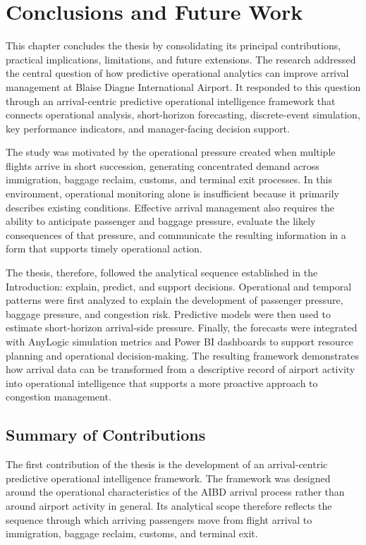 \chapter{Conclusions and Future Work}
\label{chap:conclusions-future-work}

This chapter concludes the thesis by consolidating its principal contributions, practical implications, limitations, and future extensions. The research addressed the central question of how predictive operational analytics can improve arrival management at Blaise Diagne International Airport. It responded to this question through an arrival-centric predictive operational intelligence framework that connects operational analysis, short-horizon forecasting, discrete-event simulation, key performance indicators, and manager-facing decision support.

The study was motivated by the operational pressure created when multiple flights arrive in short succession, generating concentrated demand across immigration, baggage reclaim, customs, and terminal exit processes. In this environment, operational monitoring alone is insufficient because it primarily describes existing conditions. Effective arrival management also requires the ability to anticipate passenger and baggage pressure, evaluate the likely consequences of that pressure, and communicate the resulting information in a form that supports timely operational action.

The thesis, therefore, followed the analytical sequence established in the Introduction: explain, predict, and support decisions. Operational and temporal patterns were first analyzed to explain the development of passenger pressure, baggage pressure, and congestion risk. Predictive models were then used to estimate short-horizon arrival-side pressure. Finally, the forecasts were integrated with AnyLogic simulation metrics and Power BI dashboards to support resource planning and operational decision-making. The resulting framework demonstrates how arrival data can be transformed from a descriptive record of airport activity into operational intelligence that supports a more proactive approach to congestion management.

\section{Summary of Contributions}
\label{sec:summary-contributions}

The first contribution of the thesis is the development of an arrival-centric predictive operational intelligence framework. The framework was designed around the operational characteristics of the AIBD arrival process rather than around airport activity in general. Its analytical scope therefore reflects the sequence through which arriving passengers move from flight arrival to immigration, baggage reclaim, customs, and terminal exit.


